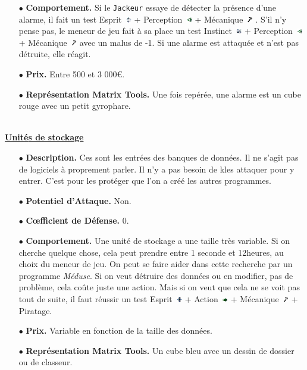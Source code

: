 \documentclass[11pt,twoside,a4paper]{article}
\def\imgINSTI{\includegraphics[width=0.25cm]{../../../../../imgGraphics/rolePlayingGame/SimulacreS/mini12x12/instinct.png} }
\def\imgESPRI{\includegraphics[width=0.25cm]{../../../../../imgGraphics/rolePlayingGame/SimulacreS/mini12x12/esprit.png} }
\def\imgPERCE{\includegraphics[width=0.25cm]{../../../../../imgGraphics/rolePlayingGame/SimulacreS/mini12x12/perception.png} }
\def\imgACTIO{\includegraphics[width=0.25cm]{../../../../../imgGraphics/rolePlayingGame/SimulacreS/mini12x12/action.png} }
\def\imgMECAN{\includegraphics[width=0.25cm]{../../../../../imgGraphics/rolePlayingGame/SimulacreS/mini12x12/mecanique.png} }
\begin{document}
\begin{multicols*}{2}
\begin{minipage}[h]{0.37\textwidth}
	\begin{itemize}
		\small
		\item[$\bullet$] \textbf{Comportement. }Si le \texttt{Jackeur} essaye de d{\'e}tecter la pr{\'e}sence d'une alarme, il fait un test Esprit~\imgESPRI  + Perception~\imgPERCE  + M{\'e}canique~\imgMECAN . S'il n'y pense pas, le meneur de jeu fait {\`a} sa place un test Instinct~\imgINSTI  + Perception~\imgPERCE  + M{\'e}canique~\imgMECAN  avec un malus de -1. Si une alarme est attaqu{\'e}e et n'est pas d{\'e}truite, elle r{\'e}agit. 
	\end{itemize}
\end{minipage}
\begin{itemize}
	\item[$\bullet$] \textbf{Prix. }Entre 500 et 3 000\euro . 
	\item[$\bullet$] \textbf{Repr{\'e}sentation Matrix Tools. }Une fois rep{\'e}r{\'e}e, une alarme est un cube rouge avec un petit gyrophare. 
\end{itemize} ~\\

\underline{\textbf{Unit{\'e}s de stockage}} %
\begin{itemize}
	\item[$\bullet$] \textbf{Description. }Ces sont les entr{\'e}es des banques de donn{\'e}es. Il ne s'agit pas de logiciels {\`a} proprement parler. Il n'y a pas besoin de kles attaquer pour y entrer. C'est pour les prot{\'e}ger que l'on a cr{\'e}{\'e} les autres programmes. 
	\item[$\bullet$] \textbf{Potentiel d'Attaque. }Non. 
	\item[$\bullet$] \textbf{C\oe fficient de D{\'e}fense. }0. 
	\item[$\bullet$] \textbf{Comportement. }Une unit{\'e} de stockage a une taille tr{\`e}s variable. Si on cherche quelque chose, cela peut prendre entre 1 seconde et 12heures, au choix du meneur de jeu. On peut se faire aider dans cette recherche par un programme \emph{M{\'e}duse}. Si on veut d{\'e}truire des donn{\'e}es ou en modifier, pas de probl{\`e}me, cela co{\^u}te juste une action. Mais si on veut que cela ne se voit pas tout de suite, il faut r{\'e}ussir un test Esprit~\imgESPRI  + Action~\imgACTIO  + M{\'e}canique~\imgMECAN  + Piratage. 
	\item[$\bullet$] \textbf{Prix. }Variable en fonction de la taille des donn{\'e}es. 
	\item[$\bullet$] \textbf{Repr{\'e}sentation Matrix Tools. }Un cube bleu avec un dessin de dossier ou de classeur. 
\end{itemize} %


\end{multicols*}
\end{document}

